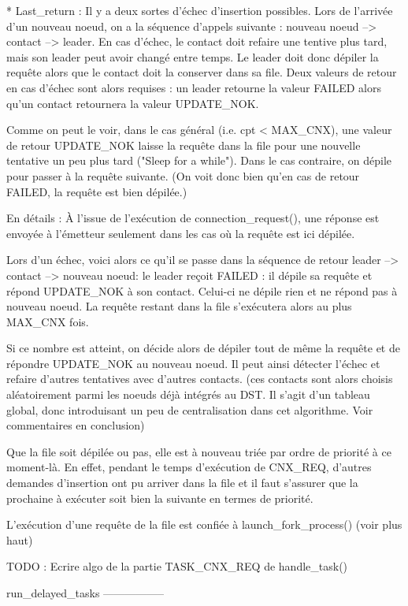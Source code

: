 * Last_return :
Il y a deux sortes d'échec d'insertion possibles.
Lors de l'arrivée d'un nouveau noeud, on a la séquence d'appels suivante : nouveau noeud -->
contact --> leader. En cas d'échec, le contact doit refaire une tentive plus tard, mais son leader
peut avoir changé entre temps. Le leader doit donc dépiler la requête alors que le contact doit la
conserver dans sa file. Deux valeurs de retour en cas d'échec sont alors requises : un leader
retourne la valeur FAILED alors qu'un contact retournera la valeur UPDATE_NOK.

Comme on peut le voir, dans le cas général (i.e. cpt < MAX_CNX), une valeur de retour UPDATE_NOK
laisse la requête dans la file pour une nouvelle tentative un peu plus tard ("Sleep for a while").
Dans le cas contraire, on dépile pour passer à la requête suivante. (On voit donc bien qu'en cas de
retour FAILED, la requête est bien dépilée.)

En détails :
À l'issue de l'exécution de connection_request(), une réponse est envoyée à l'émetteur seulement
dans les cas où la requête est ici dépilée.

Lors d'un échec, voici alors ce qu'il se passe dans la séquence de retour leader --> contact -->
nouveau noeud: le leader reçoit FAILED : il dépile sa requête et répond UPDATE_NOK à son contact.
Celui-ci ne dépile rien et ne répond pas à nouveau noeud. La requête restant dans la file s'exécutera
alors au plus MAX_CNX fois.

Si ce nombre est atteint, on décide alors de dépiler tout de même la requête et de répondre
UPDATE_NOK au nouveau noeud. Il peut ainsi détecter l'échec et refaire d'autres tentatives avec
d'autres contacts. (ces contacts sont alors choisis aléatoirement parmi les noeuds déjà intégrés au
DST. Il s'agit d'un tableau global, donc introduisant un peu de centralisation dans cet algorithme.
Voir commentaires en conclusion)

Que la file soit dépilée ou pas, elle est à nouveau triée par ordre de priorité à ce moment-là. En
effet, pendant le temps d'exécution de CNX_REQ, d'autres demandes d'insertion ont pu arriver dans la
file et il faut s'assurer que la prochaine à exécuter soit bien la suivante en termes de priorité.

L'exécution d'une requête de la file est confiée à launch_fork_process() (voir plus haut)

TODO : Ecrire algo de la partie TASK_CNX_REQ de handle_task()


run_delayed_tasks
-----------------

